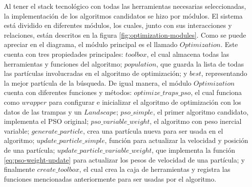 \documentclass[letterpaper]{report}
\begin{document}
    Al tener el stack tecnológico con todas las herramientas necesarias
    seleccionadas, la implementación de los algoritmos candidatos se hizo por
    módulos.
    El sistema está dividido en diferentes módulos, los cuales, junto con sus
    interacciones y relaciones, están descritos en la figura
    \ref{fig:optimization-modules}. Como se puede apreciar en el diagrama, el
    módulo principal es el llamado $Optimization$. Este cuenta con tres
    propiedades principales: $toolbox$, el cual almacena todas las herramientas
    y funciones del algoritmo; $population$, que guarda la lista de todas las
    partículas involucradas en el algoritmo de optimización; y $best$,
    representando la mejor partícula de la búsqueda. De igual manera, el módulo
    $Optimization$ cuenta con diferentes funciones y métodos:
    $optimize\_traps\_pso$, el cual funciona como $wrapper$ para configurar e
    inicializar el algoritmo de optimización con los datos de las trampas y un
    $Landscape$; $pso\_simple$, el primer algoritmo candidato, implementa el PSO
    original; $pso\_variable\_weight$, el algoritmo con peso inercial variable;
    $generate\_particle$, crea una partícula nueva para ser usada en el
    algoritmo; $update\_particle\_simple$, función para actualizar la velocidad
    y posición de una partícula; $update\_particle\_variable\_weight$, que
    implementa la función \ref{eq:pso-weight-update} para actualizar los pesos
    de velocidad de una partícula; y finalmente $create\_toolbox$, el cual crea
    la caja de herramientas y registra las funciones mencionadas anteriormente
    para ser usadas por el algoritmo.
\end{document}
